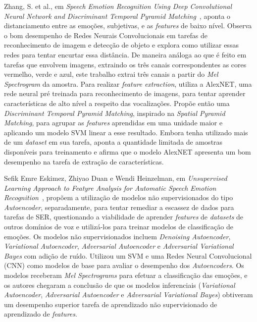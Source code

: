 Zhang, S. et al., em \textit{Speech Emotion Recognition Using Deep Convolutional Neural Network and Discriminant Temporal Pyramid Matching}~\cite{32.25}, aponta o distanciamento entre as emoções, subjetivas, e as \textit{features} de baixo nível. Observa o bom desempenho de Redes Neurais Convolucionais em tarefas de reconhecimento de imagem e detecção de objeto e explora como utilizar essas redes para tentar encurtar essa distância. De maneira análoga ao que é feito em tarefas que envolvem imagens, extraindo os três canais correspondentes as cores vermelho, verde e azul, este trabalho extrai três canais a partir do \textit{Mel Spectrogram} da amostra. Para realizar \textit{feature extraction}, utiliza a AlexNET, uma rede neural pré treinada para reconhecimento de imagens, para tentar aprender características de alto nível a respeito das vocalizações. Propõe então uma \textit{Discriminant Temporal Pyramid Matching}, inspirado na \textit{Spatial Pyramid Matching}, para agrupar as \textit{features} aprendidas em uma unidade maior e aplicando um modelo \acrshort{SVM} linear a esse resultado. Embora tenha utilizado mais de um \textit{dataset} em sua tarefa, aponta a quantidade limitada de amostras disponíveis para treinamento e afirma que o modelo AlexNET apresenta um bom desempenho na tarefa de extração de características.

Sefik Emre Eskimez, Zhiyao Duan e Wendi Heinzelman, em \textit{Unsupervised Learning Approach to Featyre Analysis for Automatic Speech Emotion Recognition}~\cite{34}, propõem a utilização de modelos não supervisionados do tipo \textit{Autoencoder}, separadamente, para tentar remediar a escassez de dados para tarefas de \acrshort{SER}, questionando a viabilidade de aprender \textit{features} de \textit{datasets} de outros domínios de voz e utilizá-los para treinar modelos de classificação de emoções. Os modelos não supervisionados incluem \textit{Denoising Autoencoder}, \textit{Variational Autoencoder}, \textit{Adversarial Autoencoder} e \textit{Adversarial Variational Bayes} com adição de ruído. Utilizou um \acrshort{SVM} e uma Redes Neural Convolucional (\acrshort{CNN}) como modelos de base para avaliar o desempenho dos \textit{Autoencoders}. Os modelos receberam \textit{Mel Spectrograms} para efetuar a classificação das emoções, e os autores chegaram a conclusão de que os modelos inferenciais (\textit{Variational Autoencoder}, \textit{Adversarial Autoencoder} e \textit{Adversarial Variational Bayes}) obtiveram um desempenho superior tarefa de aprendizado não supervisionado de aprendizado de \textit{features}.

